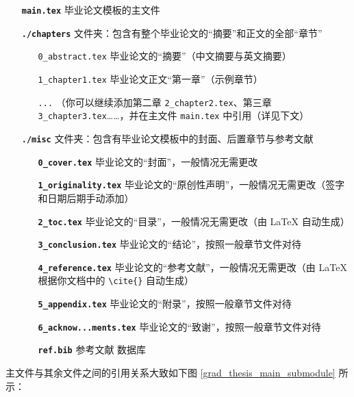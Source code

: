 \begin{itemize}
  \item[\color{RubineRed}\textbf{\texttt{main.tex}}] 毕业论文模板的主文件
  \item[\color{RubineRed}\textbf{\texttt{./chapters}}] 文件夹：包含有整个毕业论文的“摘要”和正文的全部“章节”
  \begin{itemize}
    \item[\color{RoyalBlue}\texttt{0\_abstract.tex}] 毕业论文的“摘要”（中文摘要与英文摘要）
    \item[\color{RoyalBlue}\texttt{1\_chapter1.tex}] 毕业论文正文“第一章”（示例章节）
    \item[\color{RoyalBlue}\texttt{...}] （你可以继续添加第二章 \texttt{2\_chapter2.tex}、第三章 \texttt{3\_chapter3.tex}……，并在主文件 \texttt{main.tex} 中引用（详见下文）
  \end{itemize}
  \item[\color{RubineRed}\textbf{\texttt{./misc}}] 文件夹：包含有毕业论文模板中的封面、后置章节与参考文献
  \begin{itemize}
    \item[\color{RoyalBlue}\textbf{\texttt{0\_cover.tex}}] 毕业论文的“封面”，一般情况无需更改
    \item[\color{RoyalBlue}\textbf{\texttt{1\_originality.tex}}] 毕业论文的“原创性声明”，一般情况无需更改（签字和日期后期手动添加）
    \item[\color{RoyalBlue}\textbf{\texttt{2\_toc.tex}}] 毕业论文的“目录”，一般情况无需更改（由 {\LaTeX} 自动生成）
    \item[\color{RoyalBlue}\textbf{\texttt{3\_conclusion.tex}}] 毕业论文的“结论”，按照一般章节文件对待
    \item[\color{RoyalBlue}\textbf{\texttt{4\_reference.tex}}] 毕业论文的“参考文献”，一般情况无需更改（由 {\LaTeX} 根据你文档中的 \verb|\cite{}| 自动生成）
    \item[\color{RoyalBlue}\textbf{\texttt{5\_appendix.tex}}] 毕业论文的“附录”，按照一般章节文件对待
    \item[\color{RoyalBlue}\textbf{\texttt{6\_acknow...ments.tex}}] 毕业论文的“致谢”，按照一般章节文件对待
    \item[\color{RoyalBlue}\textbf{\texttt{ref.bib}}] 参考文献  数据库
  \end{itemize}
\end{itemize}

主文件与其余文件之间的引用关系大致如下图 \ref{grad_thesis_main_submodule} 所示：

